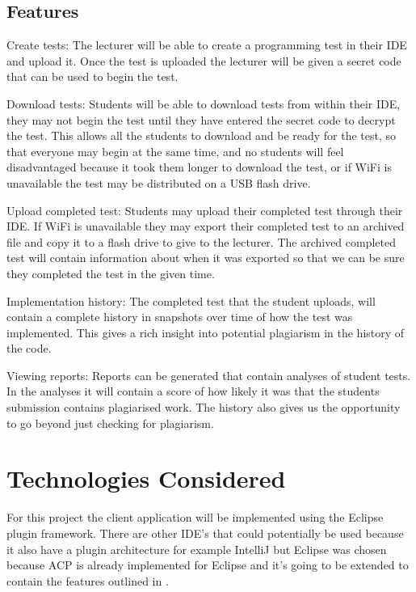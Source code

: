 \documentclass[twocolumn]{article}
\begin{document}
\subsection{Features} \label{sec:Features}
Create tests: The lecturer will be able to create a programming test in their
IDE and upload it. Once the test is uploaded the lecturer will be given a secret
code that can be used to begin the test.

Download tests: Students will be able to download tests from within their IDE,
they may not begin the test until they have entered the secret code to decrypt
the test. This allows all the students to download and be ready for the test, so
that everyone may begin at the same time, and no students will feel
disadvantaged because it took them longer to download the test, or if WiFi is
unavailable the test may be distributed on a USB flash drive.

Upload completed test: Students may upload their completed test through their
IDE. If WiFi is unavailable they may export their completed test to an archived
file and copy it to a flash drive to give to the lecturer. The archived
completed test will contain information about when it was exported so that we
can be sure they completed the test in the given time.

Implementation history: The completed test that the student uploads, will
contain a complete history in snapshots over time of how the test was
implemented. This gives a rich insight into potential plagiarism in the history
of the code.

Viewing reports: Reports can be generated that contain analyses of student
tests. In the analyses it will contain a score of how likely it was that the
students submission contains plagiarised work. The history also gives us the
opportunity to go beyond just checking for plagiarism.
\section{Technologies Considered}
For this project the client application will be implemented using the Eclipse
plugin framework. There are other IDE's that could potentially be used because
it also have a plugin architecture for example IntelliJ but Eclipse was chosen
because ACP is already implemented for Eclipse and it's going to be extended to
contain the features outlined in .
\end{document}
